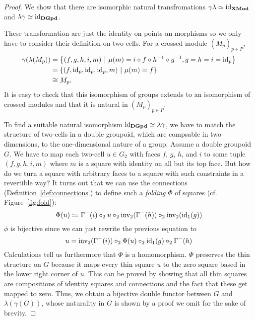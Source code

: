 \begin{proof}
We show that there are isomorphic natural transfromations $\gamma \lambda \simeq \operatorname{id}_{\mathbf{XMod}}$
and $\lambda \gamma \simeq \operatorname{id}_{\mathbf{DGpd}}$.

These transformation are just the identity on points an morphisms so we only have
to consider their definition on two-cells.
For a crossed module $(M_p)_{p \in P}$,
\begin{align*}
\gamma(\lambda(M_p)) &= \left\{ (f,g,h,i,m) ~\middle|~
	\mu(m) = i \circ f \circ h^{-1} \circ g^{-1}, g = h = i = \operatorname{id}_p \right\} \\
	&= \{ (f, \operatorname{id}_p, \operatorname{id}_p, \operatorname{id}_p, m) ~|~ \mu(m) = f\} \\
	&\cong M_p \text{.}
\end{align*}
It is easy to check that this isomorphism of groups extends to an isomorphism
of crossed modules and that it is natural in $(M_p)_{p \in P}$.

To find a suitable natural isomorphism $\operatorname{id}_{\mathbf{DGpd}} \simeq \lambda \gamma$,
we have to match the structure of two-cells in a double groupoid, which are
compsable in two dimensions, to the one-dimensional nature of a group:
Assume a double groupoid $G$.
We have to map each two-cell $u \in G_2$ with faces $f$, $g$, $h$, and $i$ to
some tuple $(f,g,h,i,m)$ where $m$ is a square with identity on all but its top
face.
But how do we turn a square with arbitrary faces to a square with such constraints
in a revertible way?
It turns out that we can use the connections (Definition~\ref{def:connections})
to define such a \emph{folding} $\Phi$ of squares (cf. Figure~\ref{fig:fold}):
\begin{equation*}
\Phi(u) \coloneqq
	\Gamma^-(i) \circ_2 u \circ_2 \operatorname{inv_2}(\Gamma^-(h)) \circ_2 \operatorname{inv_2}(\operatorname{id}_1(g))
\end{equation*}
$\phi$ is bijective since we can just rewrite the previous equation to
\begin{equation*}
u = \operatorname{inv_2}(\Gamma^-(i)) \circ_2 \Phi(u) \circ_2 \operatorname{id}_1(g) \circ_2 \Gamma^-(h)
\end{equation*}
Calculations tell us furthermore that $\Phi$ is a homomorphism.
$\Phi$ preserves the thin structure on $G$ because it maps every thin square $u$
to the zero square based in the lower right corner of $u$.
This can be proved by showing that all thin squares are compositions of identity
squares and connections and the fact that these get mapped to zero.
Thus, we obtain a bijective double functor between $G$ and $\lambda(\gamma(G))$,
whose naturality in $G$ is shown by a proof we omit for the sake of brevity.
\end{proof} %

